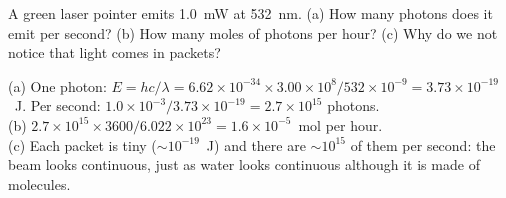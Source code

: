 A green laser pointer emits 1.0~mW at 532~nm. (a) How many photons does it emit per second?
(b) How many moles of photons per hour? (c) Why do we not notice that light comes in packets?
\begin{solution}
(a) One photon: $E = hc/\lambda = 6.62\times10^{-34}\times3.00\times10^8/532\times10^{-9} = 3.73\times10^{-19}$~J.
Per second: $1.0\times10^{-3}/3.73\times10^{-19} = 2.7\times10^{15}$ photons.\\
(b) $2.7\times10^{15}\times3600/6.022\times10^{23} = 1.6\times10^{-5}$~mol per hour.\\
(c) Each packet is tiny ($\sim10^{-19}$~J) and there are $\sim10^{15}$ of them per second: the beam looks
continuous, just as water looks continuous although it is made of molecules.
\end{solution}
